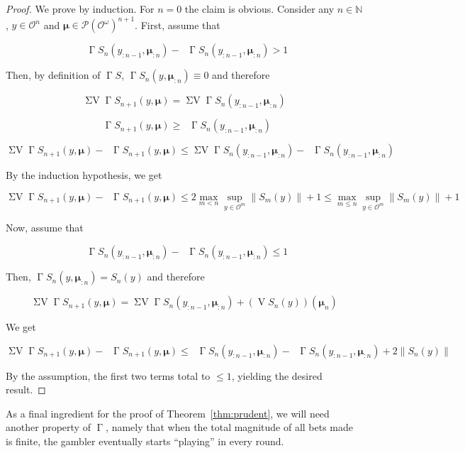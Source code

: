 \documentclass[11pt]{article}
\theoremstyle{definition}
\theoremstyle{plain}
\newcommand{\Nats}{\mathbb{N}}
\newcommand{\N}[1]{\lVert #1 \rVert}
\newcommand{\PM}{\mathcal{P}}
\newcommand{\Ob}{\mathcal{O}}
\newcommand{\OO}{\Ob^\omega}
\newcommand{\PMO}{\PM(\OO)}
\DeclareMathOperator{\V}{V}
\DeclareMathOperator{\SV}{\Sigma V}
\DeclareMathOperator{\SVM}{\Sigma V_{\min}}
\DeclareMathOperator{\SVX}{\Sigma V_{\max}}
\DeclareMathOperator{\PG}{\Gamma}
\newcommand{\BM}{\bm{\mu}}
\begin{document}
\begin{proof}

We prove by induction. For $n=0$ the claim is obvious. Consider any ${n \in \Nats}$, $y \in \Ob^{n}$ and $\BM \in \PMO^{n+1}$. First, assume that

$$\SVX \PG{S}_n\left(y_{:n-1},\BM_{:n}\right) - \SVM \PG{S}_n\left(y_{:n-1},\BM_{:n}\right) > 1$$

Then, by definition of ${\PG{S}}$, ${\PG{S}_n}\left(y,\BM_{:n}\right) \equiv 0$ and therefore

$$\SV \PG{S}_{n+1}\left(y,\BM\right)=\SV \PG{S}_n\left(y_{:n-1},\BM_{:n}\right)$$

$$\SVM \PG{S}_{n+1}\left(y,\BM\right) \geq \SVM \PG{S}_n\left(y_{:n-1},\BM_{:n}\right)$$

$$\SV \PG{S}_{n+1}\left(y,\BM\right) - \SVM \PG{S}_{n+1}\left(y,\BM\right) \leq \SV \PG{S}_n\left(y_{:n-1},\BM_{:n}\right) - \SVM \PG{S}_n\left(y_{:n-1},\BM_{:n}\right) $$

By the induction hypothesis, we get

$$\SV \PG{S}_{n+1}\left(y,\BM\right) - \SVM \PG{S}_{n+1}\left(y,\BM\right) \leq  2 \max_{m < n} \sup_{y \in \Ob^m} \N{S_m\left(y\right)}  + 1 \leq \max_{m \leq n} \sup_{y \in \Ob^m} \N{S_m\left(y\right)}  + 1$$

Now, assume that 

$$\SVX \PG{S}_n\left(y_{:n-1},\BM_{:n}\right) - \SVM \PG{S}_n\left(y_{:n-1},\BM_{:n}\right) \leq 1$$

Then, ${\PG{S}_n}\left(y,\BM_{:n}\right) = {S_n}\left(y\right)$ and therefore

$$\SV \PG{S}_{n+1}\left(y,\BM\right)=\SV \PG{S}_n\left(y_{:n-1},\BM_{:n}\right) + \left(\V{S}_n\left(y\right)\right)\left(\BM_n\right)$$

We get

$$\SV \PG{S}_{n+1}\left(y,\BM\right) - \SVM \PG{S}_{n+1}\left(y,\BM\right) \leq \SVX \PG{S}_n\left(y_{:n-1},\BM_{:n}\right) - \SVM \PG{S}_n\left(y_{:n-1},\BM_{:n}\right) + 2 \N{S_n\left(y\right)}$$

By the assumption, the first two terms total to ${\leq 1}$, yielding the desired result.
\end{proof}

As a final ingredient for the proof of Theorem~\ref{thm:prudent}, we will need another property of $\PG$, namely that when the total magnitude of all bets made is finite, the gambler eventually starts \enquote{playing} in every round.
\end{document}
